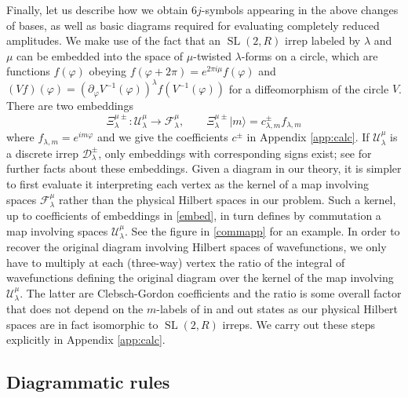\documentclass[12pt]{article}
\newcommand{\be}{\begin{equation}}
\newcommand{\ee}{\end{equation}}
\newcommand*{\ket}[1]{|{#1}\rangle}
\newcommand{\vp}{\varphi}
\newcommand{\calD}{\mathcal{D}}
\newcommand{\calF}{\mathcal{F}}
\newcommand{\calU}{\mathcal{U}}
\newcommand{\RR}{\mathbb{R}}
\DeclareMathOperator{\tSL}{\widetilde{\mathrm{SL}}}
\newcommand{\lam}{\lambda}
\newcommand{\p}{\partial}
\def\widetilde#1{#1}%
\def\RR{R}
\begin{document}
Finally, let us describe how we obtain $6j$-symbols appearing in the above changes of bases, as well as basic diagrams required for evaluating completely reduced amplitudes. We make use of the fact that an $\tSL(2,\RR)$ irrep labeled by $\lambda$ and $\mu$ can be embedded into the space of $\mu$-twisted $\lambda$-forms on a circle, which are functions $f(\vp)$ obeying $f(\vp+2\pi)=e^{2\pi i\mu }f(\vp)$ and $\left(V f\right)(\varphi)=\left(\p_{\vp}V^{-1}(\vp)\right)^{\lam}f(V^{-1}(\vp))$ for a diffeomorphism of the circle $V$. There are two embeddings
\be \label{embed}
\Xi^{\mu \pm}_{\lam}: \calU^{\mu}_{\lambda} \to  \calF^{\mu}_{\lam},\qquad  \Xi^{\mu \pm}_{\lam}\ket{m}=c^{\pm}_{\lam, m}f_{\lam, m}
\ee
where $f_{\lam, m}=e^{im\vp}$ and we give the coefficients $c^{\pm}$ in Appendix \ref{app:calc}. If $\calU^{\mu}_{\lam}$ is a discrete irrep $\calD^{\pm}_{\lam}$, only embeddings with corresponding signs exist; see \cite{SL2R} for further facts about these embeddings. Given a diagram in our theory, it is simpler to first evaluate it interpreting each vertex as the kernel of a map involving spaces $\calF^{\mu}_{\lam}$ rather than the physical Hilbert spaces in our problem. Such a kernel, up to coefficients of embeddings in \eqref{embed}, in turn defines by commutation a map involving spaces $\calU^{\mu}_{\lam}$. See the figure in \eqref{commapp} for an example. In order to recover the original diagram involving Hilbert spaces of wavefunctions, we only have to multiply at each (three-way) vertex the ratio of the integral of wavefunctions defining the original diagram over the kernel of the map involving $\calU_{\lam}^{\mu}$. The latter are Clebsch-Gordon coefficients and the ratio is some overall factor that does not depend on the $m$-labels of in and out states as our physical Hilbert spaces are in fact isomorphic to $\tSL(2,\RR)$ irreps. We carry out these steps explicitly in Appendix \ref{app:calc}.



\subsection{Diagrammatic rules}
\end{document}

